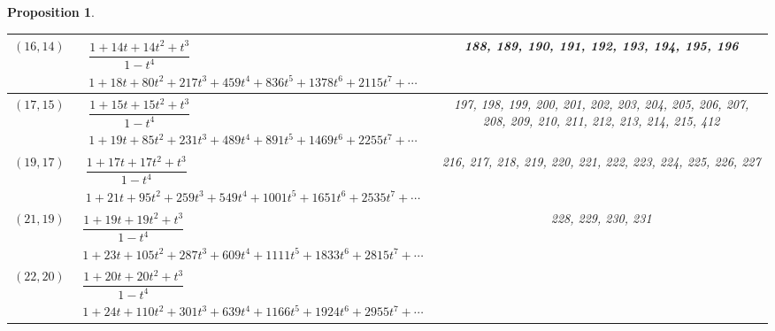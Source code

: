 \documentclass[pdftex]{sigma}%
\newtheorem{prop}[thm]{Proposition}
\theoremstyle{definition}
\numberwithin{equation}{section}
\begin{document}
\begin{prop}
\begin{table}[h!]
\begin{tabu}{c|c|c}
	$(16,14)$\label{T(14,16)}
	&
	$\begin{array}{c}
	 \dfrac{1\!+\!14t\!+\!14t^2\!+\!t^3}{1-t^4} \\[3pt]
	 {1\!+\!18t\!+\!80t^2\!+\!217t^3\!+\!459t^4\!+\!836t^5\!+\!1378t^6\!+\!2115t^7\!+\!\cdots}
	\end{array}$
	&
	 \begin{minipage}{4cm}
 \rm
 	188, 189, 190, 191, 192, 193, 194, 195, 196
 \end{minipage}
	\\ \hline
	$(17,15)$\label{T(15,17)}
	&
	$\begin{array}{c}
	 \dfrac{1\!+\!15t\!+\!15t^2\!+\!t^3}{1-t^4} \\[3pt]
	 {1\!+\!19t\!+\!85t^2\!+\!231t^3\!+\!489t^4\!+\!891t^5\!+\!1469t^6\!+\!2255t^7\!+\!\cdots}
	\end{array}$
	&
	 \begin{minipage}{4cm}
 \rm
 	197, 198, 199, 200, 201, 202, 203, 204, 205, 206,
	 207, 208, 209, 210, 211, 212, 213, 214, 215, 412
 \end{minipage}
	\\ \hline
	$(19,17)$\label{T(17,19)}
	&
	$\begin{array}{c}
	 \dfrac{1\!+\!17t\!+\!17t^2\!+\!t^3}{1-t^4} \\[3pt]
	 {1\!+\!21t\!+\!95t^2\!+\!259t^3\!+\!549t^4\!+\!1001t^5\!+\!1651t^6\!+\!2535t^7\!+\!\cdots}
	\end{array}$
	&
	 \begin{minipage}{4cm}
 \rm
 	216, 217, 218, 219, 220, 221, 222, 223, 224, 225,
	 226, 227
 \end{minipage}
	\\ \hline
	$(21,19)$\label{T(19,21)}
	&
	$\begin{array}{c}
	 \dfrac{1\!+\!19t\!+\!19t^2\!+\!t^3}{1-t^4} \\[3pt]
	 {1\!+\!23t\!+\!105t^2\!+\!287t^3\!+\!609t^4\!+\!1111t^5\!+\!1833t^6\!+\!2815t^7\!+\!\cdots}
	\end{array}$
	&
	 \begin{minipage}{4cm}
 \rm
 	228, 229, 230, 231
 \end{minipage}
	\\ \hline
	$(22,20)$\label{T(20,22)}
	&
	$\begin{array}{c}
	 \dfrac{1\!+\!20t\!+\!20t^2\!+\!t^3}{1-t^4} \\[3pt]
	 {1\!+\!24t\!+\!110t^2\!+\!301t^3\!+\!639t^4\!+\!1166t^5\!+\!1924t^6\!+\!2955t^7\!+\!\cdots}
	\end{array}$
	&
	 \begin{minipage}{4cm}

\end{minipage}
\end{tabu}
\end{table}
\end{prop}
\end{document}

